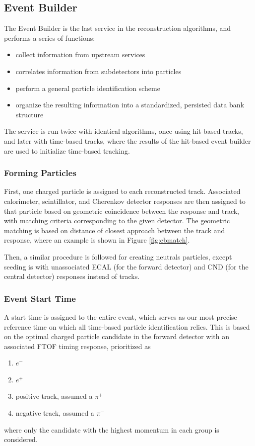 
\subsection{Event Builder}
The Event Builder is the last service in the reconstruction algorithms, and performs a series of functions:
\begin{itemize}
    \item collect information from upstream services
    \item correlates information from subdetectors into particles
    \item perform a general particle identification scheme
    \item organize the resulting information into a standardized, persisted data bank structure
\end{itemize}
The service is run twice with identical algorithms, once using hit-based tracks, and later with time-based tracks, where the results of the hit-based event builder are used to initialize time-based tracking.

\subsubsection{Forming Particles}
First, one charged particle is assigned to each reconstructed track.  Associated calorimeter, scintillator, and Cherenkov detector responses are then assigned to that particle based on geometric coincidence between the response and track, with matching criteria corresponding to the given detector.  The geometric matching is based on distance of closest approach between the track and response, where an example is shown in Figure \ref{fig:ebmatch}.

Then, a similar procedure is followed for creating neutrals particles, except seeding is with unassociated ECAL (for the forward detector) and CND (for the central detector) responses instead of tracks.

\subsubsection{Event Start Time}
A start time is assigned to the entire event, which serves as our most precise reference time on which all time-based particle identification relies.  This is based on the optimal charged particle candidate in the forward detector with an associated FTOF timing response, prioritized as
\begin{enumerate}
    \item $e^-$
    \item $e^+$
    \item positive track, assumed a $\pi^+$
    \item negative track, assumed a $\pi^-$
\end{enumerate}
where only the candidate with the highest momentum in each group is considered.


